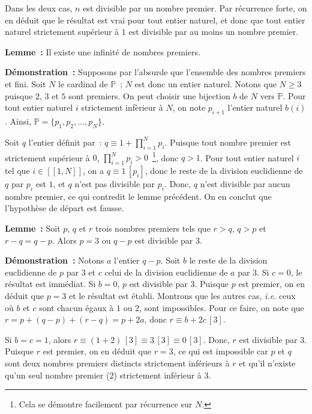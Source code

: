 Dans les deux cas, $n$ est divisible par un nombre premier. 
Par récurrence forte, on en déduit que le résultat est vrai pour tout entier naturel, et donc que tout entier naturel strictement supérieur à $1$ est divisible par au moins un nombre premier.

\done

\bigskip

\noindent\textbf{Lemme :} Il existe une infinité de nombres premiers.

\medskip

\noindent\textbf{Démonstration :} Supposons par l'absurde que l'ensemble des nombres premiers et fini. 
Soit $N$ le cardinal de $\mathbb{P}$ ; $N$ est donc un entier naturel. 
Notons que $N \geq 3$ puisque $2$, $3$ et $5$ sont premiers.
On peut choisir une bijection $b$ de $N$ vers $\mathbb{P}$. 
Pour tout entier naturel $i$ strictement infèrieur à $N$, on note $p_{i+1}$ l'entier naturel $b(i)$.
Ainsi, $\mathbb{P} = \lbrace p_1, p_2, \dots, p_N \rbrace$. 

Soit $q$ l'entier définit par : $q \equiv 1 + \prod_{i=1}^N p_i$. 
Puisque tout nombre premier est strictement supérieur à $0$, $\prod_{i=1}^N p_i > 0$~\footnote{Cela se démontre facilement par récurrence sur $N$.}, donc $q > 1$.
Pour tout entier naturel $i$ tel que $i \in [\![1, N]\!]$, on a $q \equiv 1 \, [p_i]$, donc le reste de la division euclidienne de $q$ par $p_i$ est $1$, et $q$ n'est pas divisible par $p_i$.  
Donc, $q$ n'est divisible par aucun nombre premier, ce qui contredit le lemme précédent. 
On en conclut que l'hypothèse de départ est fausse. 

\done

\bigskip

\noindent\textbf{Lemme :} Soit $p$, $q$ et $r$ trois nombres premiers tels que $r > q$, $q > p$ et $r-q = q-p$. Alors $p=3$ ou $q-p$ est divisible par $3$.

\medskip

\noindent\textbf{Démonstration :} Notons $a$ l'entier $q-p$. 
Soit $b$ le reste de la division euclidienne de $p$ par $3$ et $c$ celui de la division euclidienne de $a$ par $3$. 
Si $c = 0$, le résultat est immédiat.
Si $b = 0$, $p$ est divisible par $3$. 
Puisque $p$ est premier, on en déduit que $p=3$ et le résultat est établi. 
Montrons que les autres cas, \textit{i.e.} ceux où $b$ et $c$ sont chacun égaux à $1$ ou $2$, sont impossibles. 
Pour ce faire, on note que $r = p + (q - p) + (r - q) = p + 2 a$, donc $r \equiv b + 2 c \, [3]$.

Si $b = c = 1$, alors $r \equiv (1 + 2) \, [3] \equiv 3 \, [3] \equiv 0 \, [3]$. 
Donc, $r$ est divisible par $3$. 
Puisque $r$ est premier, on en déduit que $r=3$, ce qui est impossible car $p$ et $q$ sont deux nombres premiers distincts strictement inférieurs à $r$ et qu'il n'existe qu'un seul nombre premier ($2$) strictement inférieur à $3$. 

